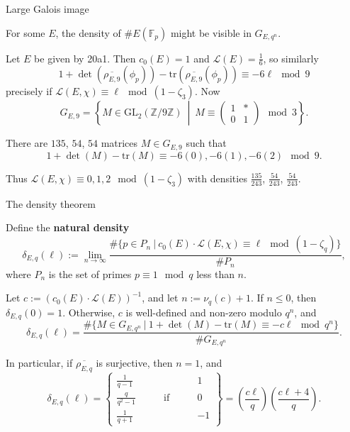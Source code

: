 \documentclass[10pt]{beamer}
\begin{document}
\begin{frame}[t]{Large Galois image}

For some $ E $, the density of $ \#E(\mathbb{F}_p) $ might be visible in $ G_{E, q^n} $.

\pause

\begin{example}
Let $ E $ be given by 20a1. Then $ c_0(E) = 1 $ and $ \mathcal{L}(E) = \tfrac{1}{6} $, so similarly
$$ 1 + \det(\overline{\rho_{E, 9}}(\phi_p)) - \mathrm{tr}(\overline{\rho_{E, 9}}(\phi_p)) \equiv -6\ell \mod 9 $$
precisely if $ \mathcal{L}(E, \chi) \equiv \ell \mod (1 - \zeta_3) $. \pause Now
$$ G_{E, 9} = \left\{M \in \mathrm{GL}_2(\mathbb{Z} / 9\mathbb{Z}) \ \middle| \ M \equiv \begin{pmatrix} 1 & * \\ 0 & 1 \end{pmatrix} \mod 3\right\}. $$

\pause

There are $ 135 $, $ 54 $, $ 54 $ matrices $ M \in G_{E, 9} $ such that
$$ 1 + \det(M) - \mathrm{tr}(M) \equiv -6(0), -6(1), -6(2) \mod 9. $$

\pause

Thus $ \mathcal{L}(E, \chi) \equiv 0, 1, 2 \mod (1 - \zeta_3) $ with densities $ \tfrac{135}{243} $, $ \tfrac{54}{243} $, $ \tfrac{54}{243} $.
\end{example}

\end{frame}

\begin{frame}[t]{The density theorem}

Define the \textbf{natural density}
$$ \delta_{E, q}(\ell) := \lim_{n \to \infty} \dfrac{\#\{p \in P_n \ | \ c_0(E) \cdot \mathcal{L}(E, \chi) \equiv \ell \mod (1 - \zeta_q)\}}{\#P_n}, $$
where $ P_n $ is the set of primes $ p \equiv 1 \mod q $ less than $ n $.

\pause

\begin{theorem}[A.]
Let $ c := (c_0(E) \cdot \mathcal{L}(E))^{-1} $, and let $ n := \nu_q(c) + 1 $. \pause If $ n \le 0 $, then $ \delta_{E, q}(0) = 1 $. \pause Otherwise, $ c $ is well-defined and non-zero modulo $ q^n $, and
$$ \delta_{E, q}(\ell) = \dfrac{\#\{M \in G_{E, q^n} \ | \ 1 + \det(M) - \mathrm{tr}(M) \equiv -c\ell \mod q^n\}}{\#G_{E, q^n}}. $$

\pause

In particular, if $ \overline{\rho_{E, q}} $ is surjective, then $ n = 1 $, and
$$ \delta_{E, q}(\ell) =
\left\{\begin{array}{lcr}
\tfrac{1}{q - 1} & & 1 \\
\tfrac{q}{q^2 - 1} & \qquad \text{if} \qquad & 0 \\
\tfrac{1}{q + 1} & & -1
\end{array}\right\}
= \left(\dfrac{c\ell}{q}\right)\left(\dfrac{c\ell + 4}{q}\right). $$
\end{theorem}

\end{frame}
\end{document}
